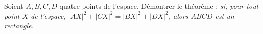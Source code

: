 Soient $A, B, C, D$ quatre points de l'espace. Démontrer le théorème : \emph{si, pour tout point $X$ de l'espace, $|AX|^2 + |CX|^2 = |BX|^2 + |DX|^2$, alors $ABCD$ est un rectangle.}
